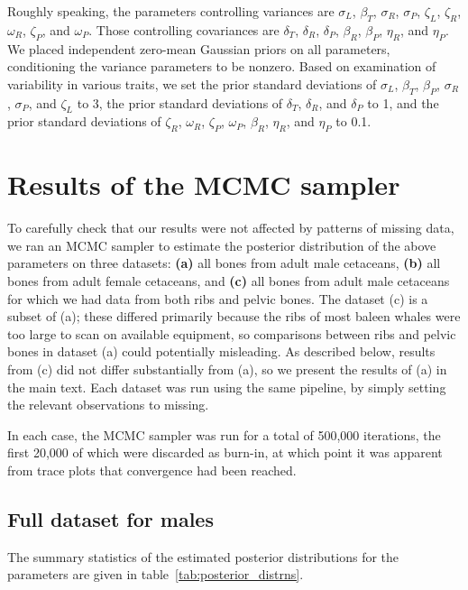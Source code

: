 \documentclass{article}
\begin{document}
Roughly speaking, the parameters controlling variances are 
$\sigma_L$, $\beta_T$, $\sigma_R$, $\sigma_P$, $\zeta_L$, $\zeta_R$, $\omega_R$, $\zeta_P$, and $\omega_P$.
Those controlling covariances are $\delta_T$, $\delta_R$, $\delta_P$, $\beta_R$, $\beta_P$, $\eta_R$, and $\eta_P$.
We placed independent zero-mean Gaussian priors on all parameters, conditioning the variance parameters to be nonzero.
Based on examination of variability in various traits, we set
the prior standard deviations of $\sigma_L$, $\beta_T$, $\beta_P$, $\sigma_R$, $\sigma_P$, and $\zeta_L$ to 3,
the prior standard deviations of $\delta_T$, $\delta_R$, and $\delta_P$ to 1,
and the prior standard deviations of $\zeta_R$, $\omega_R$, $\zeta_P$, $\omega_P$, $\beta_R$, $\eta_R$, and $\eta_P$ to 0.1.



\section{Results of the MCMC sampler}

To carefully check that our results were not affected by patterns of missing data,
we ran an MCMC sampler to estimate the posterior distribution of the above parameters
on three datasets:
\textbf{(a)} all bones from adult male cetaceans,
\textbf{(b)} all bones from adult female cetaceans,
and \textbf{(c)} all bones from adult male cetaceans for which we had data from both ribs and pelvic bones.
The dataset (c) is a subset of (a);
these differed primarily because the ribs of most baleen whales were too large to scan on available equipment,
so comparisons between ribs and pelvic bones in dataset (a) could potentially misleading.
As described below, results from (c) did not differ substantially from (a),
so we present the results of (a) in the main text.
Each dataset was run using the same pipeline, 
by simply setting the relevant observations to missing.

In each case, the MCMC sampler was run for a total of 500,000 iterations,
the first 20,000 of which were discarded as burn-in,
at which point it was apparent from trace plots that convergence had been reached.

\subsection{Full dataset for males}

The summary statistics of the estimated posterior distributions 
for the parameters
are given in table~\ref{tab:posterior_distrns}.
\end{document}
